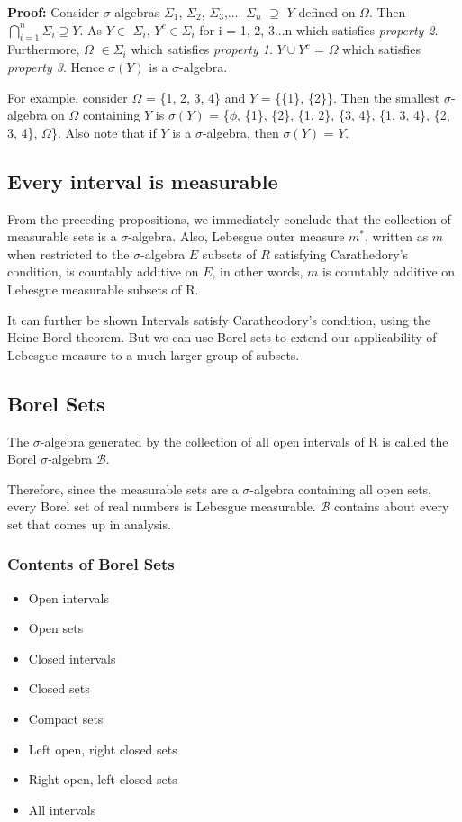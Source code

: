 \documentclass{article}
\begin{document}
\textbf{Proof: }Consider $\sigma$-algebras $\Sigma_1$, $\Sigma_2$, $\Sigma_3$,....  $\Sigma_n$ $\supseteq $ $Y$ defined on $\Omega$. Then $\bigcap\limits_{i=1}^n \Sigma_i \supseteq Y$. As $Y \in$ $\Sigma_i$, $Y^c \in \Sigma_i$ for i = 1, 2, 3...n which satisfies \textit{property 2}. Furthermore, $\Omega$ $\in \Sigma_i$ which satisfies \textit{property 1}. $Y \cup Y^c$ = $\Omega$ which satisfies \textit{property 3}. Hence $\sigma(Y)$ is a $\sigma$-algebra.

For example, consider $\Omega$ = \{1, 2, 3, 4\} and $Y$ = \{\{1\}, \{2\}\}. Then the smallest $\sigma$-algebra on $\Omega$ containing $Y$ is $\sigma(Y)$ = \{$\phi$, \{1\}, \{2\}, \{1, 2\}, \{3, 4\}, \{1, 3, 4\}, \{2, 3, 4\}, $\Omega$\}. Also note that if $Y$ is a $\sigma$-algebra, then $\sigma(Y)$ = $Y$.

\subsection{Every interval is measurable}
From the preceding propositions, we immediately conclude that the collection of measurable sets is a $\sigma$-algebra. Also, Lebesgue outer measure $m^*$, written as $m$ when restricted to the $\sigma$-algebra $E$ subsets of $R$ satisfying Carathedory's condition, is countably additive on $E$, in other words, $m$ is countably additive on Lebesgue measurable subsets of R.
\medskip

It can further be shown Intervals satisfy Caratheodory's condition, using the Heine-Borel theorem. But we can use Borel sets to extend our applicability of Lebesgue measure to a much larger group of subsets.

\subsection{Borel Sets}
The $\sigma$-algebra generated by the collection of all open intervals of R is called the Borel $\sigma$-algebra $\mathscr{B}$.

Therefore, since the measurable sets are a $\sigma$-algebra containing all open sets, every Borel set of real numbers is Lebesgue measurable. $\mathscr{B}$ contains about every set that comes up in analysis.

\subsubsection{Contents of Borel Sets}
\begin{itemize}
    \item Open intervals
    \item Open sets
    \item Closed intervals
    \item Closed sets
    \item Compact sets
    \item Left open, right closed sets
    \item Right open, left closed sets
    \item All intervals
\end{itemize}
\end{document}
